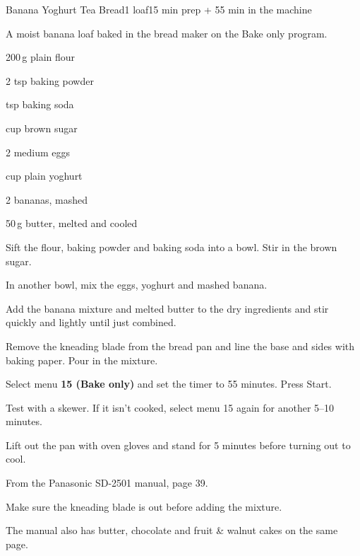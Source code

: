 \begin{recipebox}{Banana Yoghurt Tea Bread}{1 loaf}{15 min prep + 55 min in the machine}

A moist banana loaf baked in the bread maker on the Bake only program.

\begin{ingredients}
  \item 200\,g plain flour
  \item 2 tsp baking powder
  \item {} tsp baking soda
  \item {} cup brown sugar
  \item 2 medium eggs
  \item {} cup plain yoghurt
  \item 2 bananas, mashed
  \item 50\,g butter, melted and cooled
\end{ingredients}

\begin{method}
  \item Sift the flour, baking powder and baking soda into a bowl. Stir in the brown sugar.
  \item In another bowl, mix the eggs, yoghurt and mashed banana.
  \item Add the banana mixture and melted butter to the dry ingredients and stir quickly and lightly until just combined.
  \item Remove the kneading blade from the bread pan and line the base and sides with baking paper. Pour in the mixture.
  \item Select menu \textbf{15 (Bake only)} and set the timer to 55 minutes. Press Start.
  \item Test with a skewer. If it isn't cooked, select menu 15 again for another 5--10 minutes.
  \item Lift out the pan with oven gloves and stand for 5 minutes before turning out to cool.
\end{method}

\begin{notelist}
  \item From the Panasonic SD-2501 manual, page 39.
  \item Make sure the kneading blade is out before adding the mixture.
  \item The manual also has butter, chocolate and fruit \& walnut cakes on the same page.
\end{notelist}

\end{recipebox}

